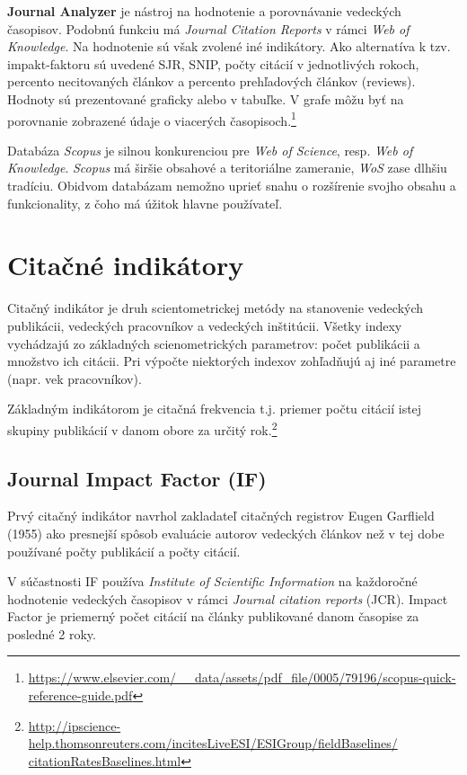 \textbf{Journal Analyzer} je nástroj na hodnotenie a porovnávanie vedeckých
časopisov. Podobnú funkciu má \emph{Journal Citation Reports} v rámci \emph{Web
  of Knowledge}. Na hodnotenie sú však zvolené iné indikátory. Ako alternatíva k
tzv. impakt-faktoru sú uvedené SJR, SNIP, počty citácií v jednotlivých rokoch,
percento necitovaných článkov a percento prehľadových článkov (reviews). Hodnoty
sú prezentované graficky alebo v tabuľke. V grafe môžu byť na porovnanie
zobrazené údaje o viacerých
časopisoch.\footnote{\url{https://www.elsevier.com/__data/assets/pdf_file/0005/79196/scopus-quick-reference-guide.pdf}}

Databáza \emph{Scopus} je silnou konkurenciou pre \emph{Web of Science}, resp. \emph{Web of
Knowledge}. \emph{Scopus} má širšie obsahové a teritoriálne zameranie, \emph{WoS} zase dlhšiu
tradíciu. Obidvom databázam nemožno uprieť snahu o rozšírenie svojho obsahu a
funkcionality, z čoho má úžitok hlavne používateľ.


\section{Citačné indikátory}

Citačný indikátor je druh scientometrickej metódy na stanovenie 
vedeckých publikácii, vedeckých pracovníkov a vedeckých inštitúcii. Všetky
indexy vychádzajú zo základných scienometrických parametrov: počet publikácii a
množstvo ich citácii. Pri výpočte niektorých indexov zohľadňujú aj iné parametre
(napr. vek pracovníkov).

Základným indikátorom je citačná frekvencia t.j. priemer počtu citácií istej
skupiny publikácií v danom obore za určitý
rok.\footnote{\url{http://ipscience-help.thomsonreuters.com/incitesLiveESI/ESIGroup/fieldBaselines/
    citationRatesBaselines.html}}


\subsection{Journal Impact Factor (IF)}

Prvý citačný indikátor navrhol zakladateľ citačných registrov Eugen Garflield
(1955) ako presnejší spôsob evaluácie autorov vedeckých článkov než v tej dobe
používané počty publikácií a počty citácií.

V súčastnosti IF používa \emph{Institute of Scientific Information} na
každoročné hodnotenie vedeckých časopisov v rámci \emph{Journal citation
  reports} (JCR). Impact Factor je priemerný počet citácií na články publikované
danom časopise za posledné 2 roky.

